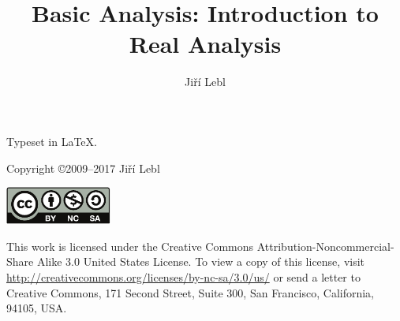 \documentclass[12pt]{book}
\author{Ji\v{r}\'i Lebl}
\title{Basic Analysis: Introduction to Real Analysis}
\theoremstyle{plain}
\theoremstyle{remark}
\theoremstyle{definition}
\theoremstyle{exercise}
\theoremstyle{example}
\begin{document}
\ifpdf
\fi
\newlength{\centeroffset}
\setlength{\centeroffset}{-0.5\oddsidemargin}
\addtolength{\centeroffset}{0.5\evensidemargin}
\thispagestyle{empty}
\noindent\hspace*{\centeroffset}

\noindent\hspace*{\centeroffset}



\pagebreak

\vspace*{\fill}

\noindent
Typeset in \LaTeX.


\bigskip

\noindent
Copyright \copyright 2009--2017 Ji{\v r}\'i Lebl


\bigskip

\noindent
\includegraphics[width=1.38in]{figures/license}

\bigskip

\noindent
This work is licensed under the Creative Commons
Attribution-Non\-commercial-Share Alike 3.0 United States License. To view a
copy of this license, visit
\url{http://creativecommons.org/licenses/by-nc-sa/3.0/us/} or send a letter to
Creative Commons, 171 Second Street, Suite 300, San Francisco, California,
94105, USA.
\end{document}
